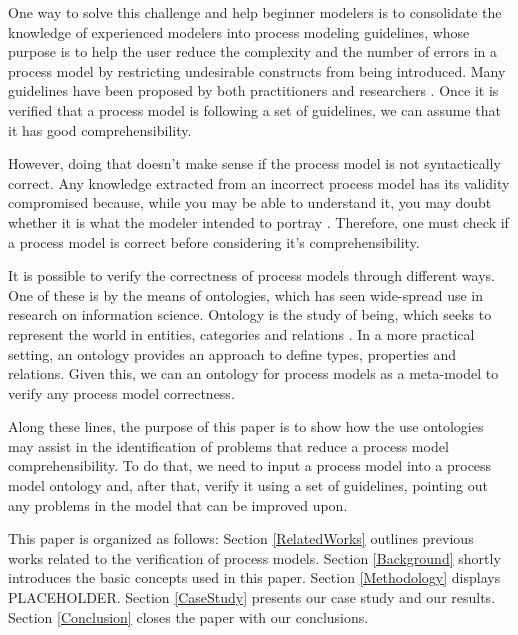 \documentclass[a4paper,twoside]{article}
\begin{document}
One way to solve this challenge and help beginner modelers is to consolidate the knowledge of experienced modelers into process modeling guidelines, whose purpose is to help the user reduce the complexity and the number of errors in a process model by restricting undesirable constructs from being introduced. Many guidelines have been proposed by both practitioners \cite{Silver2009} \cite{White2008} \cite{Allweyer2010} and researchers \cite{Becker2000} \cite{Mendling2007} \cite{Vanderfeesten2008} \cite{Correia2012}. Once it is verified that a process model is following a set of guidelines, we can assume that it has good comprehensibility.


However, %
doing that doesn't make sense if the process model is not syntactically correct. Any knowledge extracted from an incorrect process model has its validity compromised because, while you may be able to understand it, you may doubt whether it is what the modeler intended to portray \cite{Reijers2015}. Therefore, one must check if a process model is correct before considering it's comprehensibility.


It is possible to verify the correctness of process models through different ways. One of these is by the means of ontologies, which has seen wide-spread use in research on information science. Ontology is the study of being, which seeks to represent the world in entities, categories and relations \cite{Mendling2008}. In a more practical setting, an ontology provides an approach to define types, properties and relations. Given this, we can an ontology for process models as a meta-model to verify any process model correctness.


Along these lines, the purpose of this paper is to show how the use ontologies may assist in the identification of problems that reduce a process model comprehensibility. To do that, we need to input a process model into a process model ontology and, after that, verify it using a set of guidelines, pointing out any problems in the model that can be improved upon.


This paper is organized as follows: Section \ref{RelatedWorks} outlines previous works related to the verification of process models. Section \ref{Background} shortly introduces the basic concepts used in this paper. Section \ref{Methodology} displays PLACEHOLDER. Section \ref{CaseStudy} presents our case study and our results. Section \ref{Conclusion} closes the paper with our conclusions.
\end{document}
